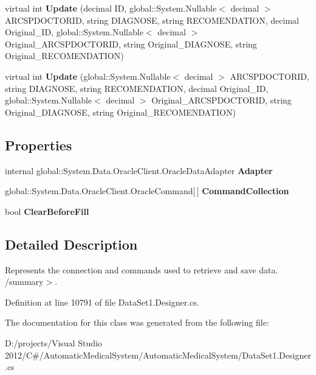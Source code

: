 \begin{CompactItemize}
\item 
virtual int \textbf{Update} (decimal ID, global::System.Nullable$<$ decimal $>$ ARCSPDOCTORID, string DIAGNOSE, string RECOMENDATION, decimal Original\_\-ID, global::System.Nullable$<$ decimal $>$ Original\_\-ARCSPDOCTORID, string Original\_\-DIAGNOSE, string Original\_\-RECOMENDATION)\label{class_automatic_medical_system_1_1_data_set1_table_adapters_1_1_d_i_a_g_n_o_s_e___s_p___d_o_c_t_o_r_table_adapter_199bbcd215d28cba1169210198640402}

\item 
virtual int \textbf{Update} (global::System.Nullable$<$ decimal $>$ ARCSPDOCTORID, string DIAGNOSE, string RECOMENDATION, decimal Original\_\-ID, global::System.Nullable$<$ decimal $>$ Original\_\-ARCSPDOCTORID, string Original\_\-DIAGNOSE, string Original\_\-RECOMENDATION)\label{class_automatic_medical_system_1_1_data_set1_table_adapters_1_1_d_i_a_g_n_o_s_e___s_p___d_o_c_t_o_r_table_adapter_5f2c601200f16d34b4da5cb6a8503a6c}

\end{CompactItemize}
\subsection*{Properties}
\begin{CompactItemize}
\item 
internal global::System.Data.OracleClient.OracleDataAdapter \textbf{Adapter}\hspace{0.3cm}{\tt  [get]}\label{class_automatic_medical_system_1_1_data_set1_table_adapters_1_1_d_i_a_g_n_o_s_e___s_p___d_o_c_t_o_r_table_adapter_d303e7c8a834f22647fd6dc92185362a}

\item 
global::System.Data.OracleClient.OracleCommand[$\,$] \textbf{CommandCollection}\hspace{0.3cm}{\tt  [get]}\label{class_automatic_medical_system_1_1_data_set1_table_adapters_1_1_d_i_a_g_n_o_s_e___s_p___d_o_c_t_o_r_table_adapter_4be0dc90540da523f9c119e439541b8b}

\item 
bool \textbf{ClearBeforeFill}\hspace{0.3cm}{\tt  [get, set]}\label{class_automatic_medical_system_1_1_data_set1_table_adapters_1_1_d_i_a_g_n_o_s_e___s_p___d_o_c_t_o_r_table_adapter_7bac75426653273be09cf95222881f7d}

\end{CompactItemize}


\subsection{Detailed Description}
Represents the connection and commands used to retrieve and save data. /summary$>$. 

Definition at line 10791 of file DataSet1.Designer.cs.

The documentation for this class was generated from the following file:\begin{CompactItemize}
\item 
D:/projects/Visual Studio 2012/C\#/AutomaticMedicalSystem/AutomaticMedicalSystem/DataSet1.Designer.cs\end{CompactItemize}
